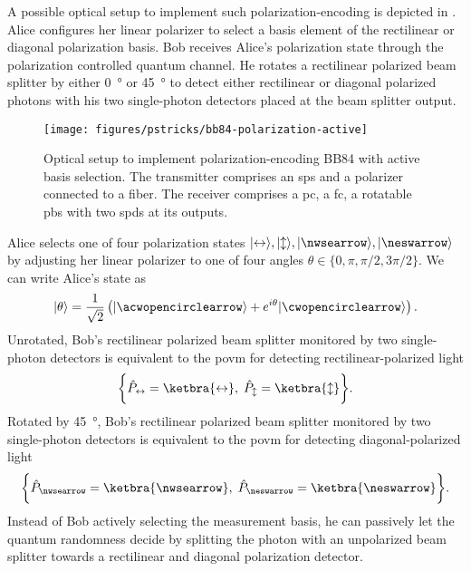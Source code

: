 A possible optical setup to implement such polarization-encoding is depicted in .
Alice configures her linear polarizer to select a basis element of the rectilinear or diagonal polarization basis. Bob receives Alice's polarization state through the polarization controlled quantum channel. He rotates a rectilinear polarized beam splitter by either \SI{0}{\degree} or \SI{45}{\degree} to detect either rectilinear or diagonal polarized photons with his two single-photon detectors placed at the beam splitter output.
\begin{figure}[htb]
	\centering
	\texttt{[image: figures/pstricks/bb84-polarization-active]}
	\caption{Optical setup to implement polarization-encoding BB84 with active basis selection. The transmitter comprises an \gls{sps} and a polarizer connected to a fiber. The receiver comprises a \gls{pc}, a \gls{fc}, a rotatable \gls{pbs} with two \gls{spd}s at its outputs.}\label{fig:polarization_encoding_active}
\end{figure}
Alice selects one of four polarization states $\ket{\leftrightarrow},\ket{\updownarrow},\ket{\nwsearrow},\ket{\neswarrow}$ by adjusting her linear polarizer to one of four angles $\theta\in\{0,\pi,\pi/2,3\pi/2\}$.
We can write Alice's state as
\begin{equation}
	\ket{\theta}
	=
	\frac{1}{\sqrt{2}}
	\left(
		\ket{\acwopencirclearrow}
		+
		e^{i\theta}
		\ket{\cwopencirclearrow}
	\right)
	.
\end{equation}
Unrotated, Bob's rectilinear polarized beam splitter monitored by two single-photon detectors is equivalent to the \gls{povm} for detecting rectilinear-polarized light
\begin{equation}
	\biggl\{
		\hat{P}_{\leftrightarrow}
		=
		\ketbra{\leftrightarrow},
		\;
		\hat{P}_{\updownarrow}
		=
		\ketbra{\updownarrow}
	\biggr\}
	.
\end{equation}
Rotated by \SI{45}{\degree}, Bob's rectilinear polarized beam splitter monitored by two single-photon detectors is equivalent to the \gls{povm} for detecting diagonal-polarized light
\begin{equation}
	\biggl\{
		\hat{P}_{\nwsearrow}
		=
		\ketbra{\nwsearrow},
		\;
		\hat{P}_{\neswarrow}
		=
		\ketbra{\neswarrow}
	\biggr\}
	.
\end{equation}
Instead of Bob actively selecting the measurement basis, he can passively let the quantum randomness decide by splitting the photon with an unpolarized beam splitter towards a rectilinear and diagonal polarization detector.
